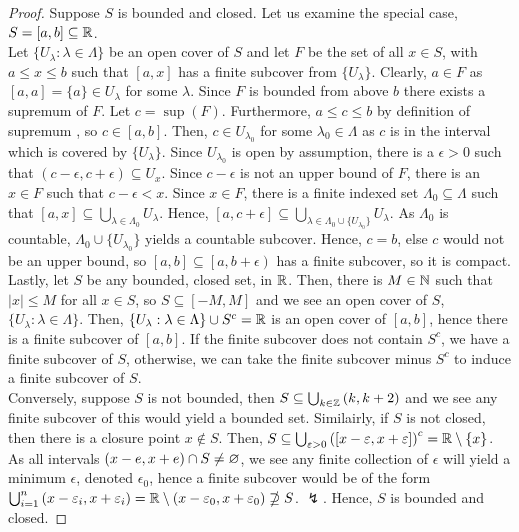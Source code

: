 \begin{proof}
	Suppose \(S \) is bounded and closed. Let us examine the special case, \(S = \left[ a, b \right] \subseteq \mathbb{R}\).\\
	Let \(\{U_{\lambda} : \lambda \in \Lambda\} \) be an open cover of \(S\) and let \(F\) be the set of all \(x \in S\), with \(a\le x\le b\) such that \(\left[ a, x \right] \) has a finite subcover from \(\{U_{\lambda}\} \). Clearly, \(a \in F\) as \(\left[ a, a \right] = \{a\} \in U_{\lambda}\) for some \(\lambda\). Since \(F\) is bounded from above \(b\) there exists a supremum of \(F\). Let \(c = \sup \left( F \right) \). Furthermore, \(a\le c\le b\) by definition of supremum , so \(c \in \left[ a, b \right] \).
	Then, \(c \in U_{\lambda_0}\) for some \(\lambda_0 \in \Lambda\) as \(c\) is in the interval which is covered by \(\{U_{\lambda}\} \). Since \(U_{\lambda_0}\)  is open by assumption, there is a \(\epsilon > 0\) such that \(\left( c-\epsilon, c + \epsilon \right) \subseteq U_{x}\). Since \(c - \epsilon\) is not an upper bound of \(F\), there is an \(x \in F\) such that \(c - \epsilon < x\). Since \(x \in F\), there is a finite indexed set \(\Lambda_0 \subseteq \Lambda\) such that \(\left[ a, x \right] \subseteq \bigcup_{\lambda \in \Lambda_0} U_{\lambda}\). Hence, \(\left[ a, c + \epsilon \right] \subseteq \bigcup_{\lambda \in \Lambda_0 \cup \{U_{\lambda_0}\}}  U_{\lambda}\). As \(\Lambda_0\) is countable, \(\Lambda_0 \cup \{U_{\lambda_0}\} \) yields a countable subcover. Hence, \(c = b\), else \(c\) would not be an upper bound, so \(\left[ a, b \right] \subseteq \left[ a, b + \epsilon \right)\) has a finite subcover, so it is compact. Lastly, let \(S\) be any bounded, closed set, in \(\mathbb{R}\). Then, there is \(M \in \mathbb{N}\) such that \(\left| x \right| \le M\) for all \(x \in S\), so \(S \subseteq \left[ -M, M \right] \) and we see an open cover of \(S\), \(\{U_{\lambda} : \lambda \in \Lambda\} \). Then, \(\{U_{\lambda} : \lambda \in \Lambda\} \cup S^{c} = \mathbb{R}\) is an open cover of \(\left[ a, b \right] \), hence there is a finite subcover of \(\left[ a, b \right] \). If the finite subcover does not contain \(S^{c}\), we have a finite subcover of \(S\), otherwise, we can take the finite subcover minus \(S^{c}\) to induce a finite subcover of \(S\).
	\\ Conversely, suppose \(S\) is not bounded, then \(S \subseteq \bigcup_{k \in \mathbb{Z}} \left( k, k+2 \right)  \) and we see any finite subcover of this would yield a bounded set. Similairly, if \(S\) is not closed, then there is a closure point \( x\not\in S\). Then, \(S \subseteq \bigcup_{\varepsilon > 0}\left( \left[ x-\varepsilon, x+\varepsilon \right]  \right) ^{c}  = \mathbb{R} \setminus \{x\} \). As all intervals \(\left( x-e, x+e \right) \cap S \neq \varnothing\), we see any finite collection of \(\epsilon\) will yield a minimum \(\epsilon\), denoted \(\epsilon_0\), hence a finite subcover would be of the form \(\bigcup_{i=1} ^{n}\left( x-\varepsilon _{i}, x+\varepsilon_{i} \right)  = \mathbb{R} \setminus \left( x-\varepsilon_0, x+\varepsilon_0 \right) \nsupseteq S \). \(\lightning\). Hence, \(S\) is bounded and closed.
\end{proof}
